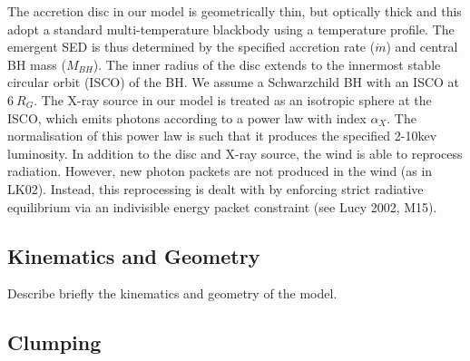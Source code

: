 \documentclass[preprint, a4paper, 11pt]{aastex}
\begin{document}
The accretion disc in our model is geometrically thin, but optically thick
and this adopt a standard multi-temperature blackbody
using a \cite{shakurasunyaev1973} temperature profile. 
The emergent SED is thus determined by the specified accretion rate ($\dot{m}$)
and central BH mass ($M_{BH}$).
The inner radius of the disc extends to the innermost 
stable circular orbit (ISCO) of the BH. 
We assume a Schwarzchild BH with an ISCO at $6~R_G$.
The X-ray source in our model is treated as an isotropic sphere at the ISCO,
which emits photons according to a power law with index $\alpha_X$.
The normalisation of this power law is such that it produces the specified 
2-10kev luminosity.
In addition to the disc and X-ray source, 
the wind is able to reprocess radiation. However, new 
photon packets are not produced in the wind (as in LK02). 
Instead, this reprocessing is dealt with by enforcing strict
radiative equilibrium via an indivisible energy packet
constraint (see Lucy 2002, M15).









\subsection{Kinematics and Geometry}

Describe briefly the kinematics and geometry of the model.

\subsection{Clumping}
\end{document}

